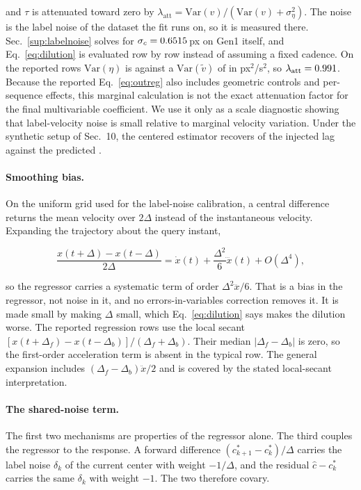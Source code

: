 \documentclass[10pt,twocolumn,letterpaper]{article}
\begin{document}
and $\tau$ is attenuated toward zero by
$\lambda_{\mathrm{att}}=\mathrm{Var}(v)/(\mathrm{Var}(v)+\sigma_{\eta}^{2})$.
The noise is the label noise of the dataset the fit runs on, so it is measured
there. Sec.~\ref{sup:labelnoise} solves for $\sigma_{c}=0.6515$\,px on
Gen1 itself, and Eq.~\ref{eq:dilution} is evaluated row by row instead of assuming a fixed cadence. On the
reported rows $\mathrm{Var}(\eta)$ is \eivVarNoise{} against a
$\mathrm{Var}(\tilde v)$ of \eivVarObs{} in px$^{2}$/s$^{2}$, so
$\lambda_{\mathrm{att}}=0.991{}$. Because the reported Eq.~\ref{eq:outreg} also includes geometric
controls and per-sequence effects, this marginal calculation is not the exact attenuation
factor for the final multivariable coefficient. We use it only as a scale diagnostic showing
that label-velocity noise is small relative to marginal velocity variation. Under the synthetic
setup of Sec.~10, the centered estimator recovers \synRecover{} of the injected lag against the
predicted \synLambda{}.

\paragraph{Smoothing bias.} On the uniform grid used for the label-noise
calibration, a central difference returns the mean velocity over $2\Delta$
instead of the instantaneous velocity. Expanding the trajectory about the
query instant,

\begin{equation}
\frac{x(t+\Delta)-x(t-\Delta)}{2\Delta}
=\dot{x}(t)+\frac{\Delta^{2}}{6}\dddot{x}(t)+O(\Delta^{4}),
\end{equation}

so the regressor carries a systematic term of order $\Delta^{2}\dddot{x}/6$. That
is a bias in the regressor, not noise in it, and no errors-in-variables
correction removes it. It is made small by making $\Delta$ small, which
Eq.~\ref{eq:dilution} says makes the dilution worse.
The reported regression rows use the local secant
$[x(t+\Delta_f)-x(t-\Delta_b)]/(\Delta_f+\Delta_b)$. Their median
$|\Delta_f-\Delta_b|$ is zero, so the first-order acceleration term is absent
in the typical row. The general expansion includes
$(\Delta_f-\Delta_b)\ddot{x}/2$ and is covered by the stated local-secant
interpretation.

\paragraph{The shared-noise term.} The first two mechanisms are properties of the
regressor alone. The third couples the regressor to the response. A forward
difference $(c^{*}_{k+1}-c^{*}_{k})/\Delta$ carries the label noise $\delta_{k}$ of
the current center with weight $-1/\Delta$, and the residual
$\hat{c}-c^{*}_{k}$ carries the same $\delta_{k}$ with weight $-1$. The two therefore covary.
\end{document}

